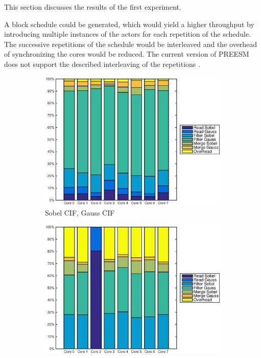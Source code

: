 This section discusses the results of the first experiment. 

 A block schedule could be generated, which would yield a higher throughput by introducing multiple instances of the actors for each repetition of the schedule. The successive repetitions of the schedule would be interleaved and the overhead of synchronizing the cores would be reduced. The current version of PREESM does not support the described interleaving of the repetitions \cite{pelcat2014preesm}.

\begin{figure}
    \centering
    \begin{subfigure}[t]{0.49\textwidth}
        \centering
        \includegraphics[width=0.99\linewidth]{images/openem_cifcif_8cores_eo.eps}
        \caption{Sobel CIF, Gauss CIF}
        \label{fig:oem8coreeo}
    \end{subfigure}
    \begin{subfigure}[t]{0.49\textwidth}
        \centering
        \includegraphics[width=0.99\linewidth]{images/openem_sobel4cif_gausscif_eo.eps}

\end{subfigure}
\end{figure}
